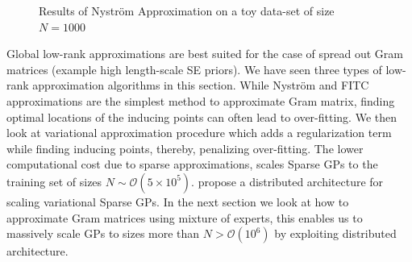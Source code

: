 \begin{figure}[!ht]
  \centering
    \quad
{}\quad
  
       \caption{Results of Nystr\"{o}m Approximation on a toy data-set of size $N=1000$ }\label{figGPPredictionNystorm}
\end{figure}

Global low-rank approximations are best suited for the case of spread out Gram matrices (example high length-scale SE priors). We have seen three types of low-rank approximation algorithms in this section. While Nystr\"{o}m and FITC approximations are the simplest method to approximate Gram matrix, finding optimal locations of the inducing points can often lead to over-fitting. We then look at variational approximation procedure which adds a regularization term while finding inducing points, thereby, penalizing over-fitting. The lower computational cost due to sparse approximations, scales Sparse GPs to the training set of sizes $N \sim \mathcal{O}(5 \times 10^5)$. \cite{Gal2014Distributed} propose a distributed architecture for scaling variational Sparse GPs. In the next section we look at how to approximate Gram matrices using mixture of experts, this enables us to massively scale GPs to sizes more than $N > \mathcal{O}(10^6)$ by exploiting distributed architecture.

